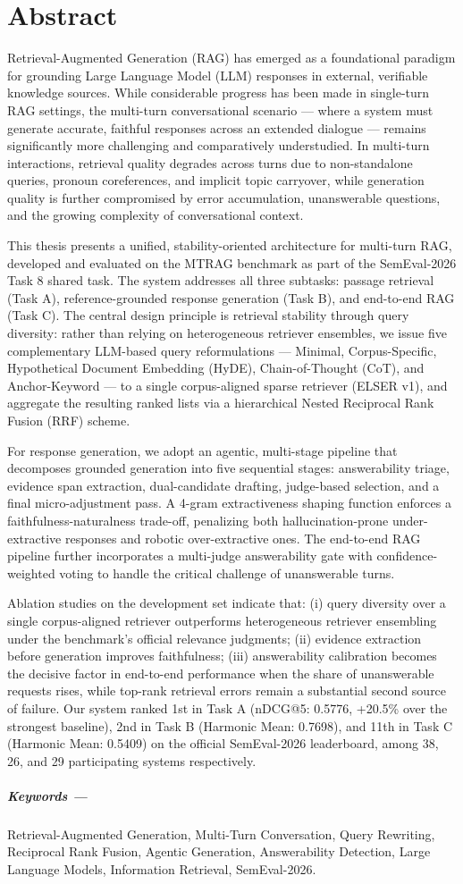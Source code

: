 \chapter*{Abstract}

Retrieval-Augmented Generation (RAG) has emerged as a foundational paradigm for
grounding Large Language Model (LLM) responses in external, verifiable knowledge
sources. While considerable progress has been made in single-turn RAG settings, the
multi-turn conversational scenario — where a system must generate accurate, faithful
responses across an extended dialogue — remains significantly more challenging and
comparatively understudied. In multi-turn interactions, retrieval quality degrades across
turns due to non-standalone queries, pronoun coreferences, and implicit topic carryover,
while generation quality is further compromised by error accumulation, unanswerable
questions, and the growing complexity of conversational context.
 
This thesis presents a unified, stability-oriented architecture for multi-turn RAG,
developed and evaluated on the MTRAG benchmark as part of the SemEval-2026 Task 8
shared task. The system addresses all three subtasks: passage retrieval (Task A),
reference-grounded response generation (Task B), and end-to-end RAG (Task C). The
central design principle is retrieval stability through query diversity: rather than relying
on heterogeneous retriever ensembles, we issue five complementary LLM-based query
reformulations — Minimal, Corpus-Specific, Hypothetical Document Embedding (HyDE),
Chain-of-Thought (CoT), and Anchor-Keyword — to a single corpus-aligned sparse
retriever (ELSER v1), and aggregate the resulting ranked lists via a hierarchical
Nested Reciprocal Rank Fusion (RRF) scheme.
 
For response generation, we adopt an agentic, multi-stage pipeline that decomposes
grounded generation into five sequential stages: answerability triage, evidence
span extraction, dual-candidate drafting, judge-based selection, and a final micro-adjustment pass. A 4-gram
extractiveness shaping function enforces a faithfulness-naturalness trade-off, penalizing
both hallucination-prone under-extractive responses and robotic over-extractive ones.
The end-to-end RAG pipeline further incorporates a multi-judge answerability gate with
confidence-weighted voting to handle the critical challenge of unanswerable turns.
 
Ablation studies on the development set indicate that: (i) query diversity over a single
corpus-aligned retriever outperforms heterogeneous retriever ensembling under the
benchmark's official relevance judgments; (ii) evidence extraction before generation
improves faithfulness; (iii) answerability calibration becomes the decisive factor in end-to-end performance
when the share of unanswerable requests rises, while top-rank retrieval errors remain a
substantial second source of failure. Our system ranked 1st in Task A (nDCG@5: 0.5776, +20.5\% over the
strongest baseline), 2nd in Task B (Harmonic Mean: 0.7698), and 11th in Task C
(Harmonic Mean: 0.5409) on the official SemEval-2026 leaderboard, among 38, 26, and 29
participating systems respectively.
 
\paragraph*{Keywords ---}
Retrieval-Augmented Generation, Multi-Turn Conversation, Query Rewriting,
Reciprocal Rank Fusion, Agentic Generation, Answerability Detection,
Large Language Models, Information Retrieval, SemEval-2026.